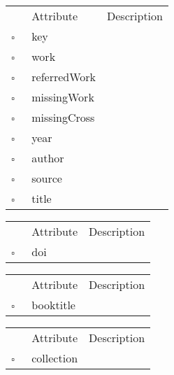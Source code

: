 \clearpage
\begin{table}
\caption{CrossReference  }

\begin{longtable}{llp{8cm}}
& Attribute & Description \\
$\square$\ & key &  \\
$\square$\ & work &  \\
$\square$\ & referredWork &  \\
$\square$\ & missingWork &  \\
$\square$\ & missingCross &  \\
$\square$\ & year &  \\
$\square$\ & author &  \\
$\square$\ & source &  \\
$\square$\ & title &  \\
\end{longtable}
\label{attr:CrossReference}
\end{table}

\begin{table}
\caption{DoiReference  }

\begin{longtable}{llp{8cm}}
& Attribute & Description \\
$\square$\ & doi &  \\
\end{longtable}
\label{attr:DoiReference}
\end{table}

\begin{table}
\caption{InBook  }

\begin{longtable}{llp{8cm}}
& Attribute & Description \\
$\square$\ & booktitle &  \\
\end{longtable}
\label{attr:InBook}
\end{table}

\begin{table}
\caption{InCollection  }

\begin{longtable}{llp{8cm}}
& Attribute & Description \\
$\square$\ & collection &  \\
\end{longtable}
\label{attr:InCollection}
\end{table}

